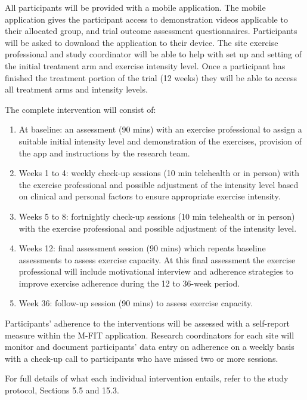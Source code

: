 \documentclass[
]{article}
\begin{document}
All participants will be provided with a mobile application.
The mobile application gives the participant access to demonstration videos applicable to their allocated group, and trial outcome assessment questionnaires.
Participants will be asked to download the application to their device.
The site exercise professional and study coordinator will be able to help with set up and setting of the initial treatment arm and exercise intensity level.
Once a participant has finished the treatment portion of the trial (12 weeks) they will be able to access all treatment arms and intensity levels.

The complete intervention will consist of:

\begin{enumerate}
  \def\labelenumi{\arabic{enumi}.}
  \item At baseline: an assessment (90 mins) with an exercise professional to assign a suitable initial intensity level and demonstration of the exercises, provision of the app and instructions by the research team.
  \item Weeks 1 to 4: weekly check-up sessions (10 min telehealth or in person) with the exercise professional and possible adjustment of the intensity level based on clinical and personal factors to ensure appropriate exercise intensity.
  \item Weeks 5 to 8: fortnightly check-up sessions (10 min telehealth or in person) with the exercise professional and possible adjustment of the intensity level.
  \item Weeks 12: final assessment session (90 mins) which repeats baseline assessments to assess exercise capacity. At this final assessment the exercise professional will include motivational interview and adherence strategies to improve exercise adherence during the 12 to 36-week period.
  \item Week 36: follow-up session (90 mins) to assess exercise capacity.
\end{enumerate}

Participants’ adherence to the interventions will be assessed with a self-report measure within the M-FIT application.
Research coordinators for each site will monitor and document participants’ data entry on adherence on a weekly basis with a check-up call to participants who have missed two or more sessions.

For full details of what each individual intervention entails, refer to the study protocol, Sections 5.5 and 15.3.
\end{document}
